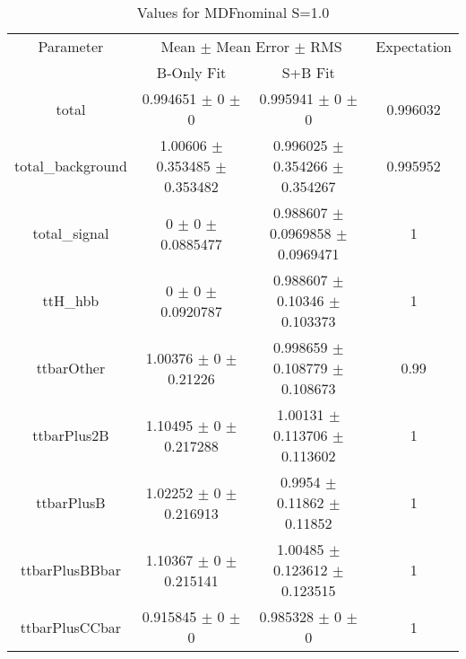 \begin{table}
\centering
\caption{Values for MDFnominal S=1.0}
\begin{tabular}{cccc}
\toprule
Parameter & \multicolumn{2}{c}{Mean $\pm$ Mean Error $\pm$ RMS} & Expectation\\
 & B-Only Fit & S+B Fit & \\
\midrule
total & \num{0.994651} $\pm$ \num{0} $\pm$ \num{0} & \num{0.995941} $\pm$ \num{0} $\pm$ \num{0} & \num{0.996032}\\
total\_background & \num{1.00606} $\pm$ \num{0.353485} $\pm$ \num{0.353482} & \num{0.996025} $\pm$ \num{0.354266} $\pm$ \num{0.354267} & \num{0.995952}\\
total\_signal & \num{0} $\pm$ \num{0} $\pm$ \num{0.0885477} & \num{0.988607} $\pm$ \num{0.0969858} $\pm$ \num{0.0969471} & \num{1}\\
ttH\_hbb & \num{0} $\pm$ \num{0} $\pm$ \num{0.0920787} & \num{0.988607} $\pm$ \num{0.10346} $\pm$ \num{0.103373} & \num{1}\\
ttbarOther & \num{1.00376} $\pm$ \num{0} $\pm$ \num{0.21226} & \num{0.998659} $\pm$ \num{0.108779} $\pm$ \num{0.108673} & \num{0.99}\\
ttbarPlus2B & \num{1.10495} $\pm$ \num{0} $\pm$ \num{0.217288} & \num{1.00131} $\pm$ \num{0.113706} $\pm$ \num{0.113602} & \num{1}\\
ttbarPlusB & \num{1.02252} $\pm$ \num{0} $\pm$ \num{0.216913} & \num{0.9954} $\pm$ \num{0.11862} $\pm$ \num{0.11852} & \num{1}\\
ttbarPlusBBbar & \num{1.10367} $\pm$ \num{0} $\pm$ \num{0.215141} & \num{1.00485} $\pm$ \num{0.123612} $\pm$ \num{0.123515} & \num{1}\\
ttbarPlusCCbar & \num{0.915845} $\pm$ \num{0} $\pm$ \num{0} & \num{0.985328} $\pm$ \num{0} $\pm$ \num{0} & \num{1}\\
\bottomrule
\end{tabular}
\end{table}